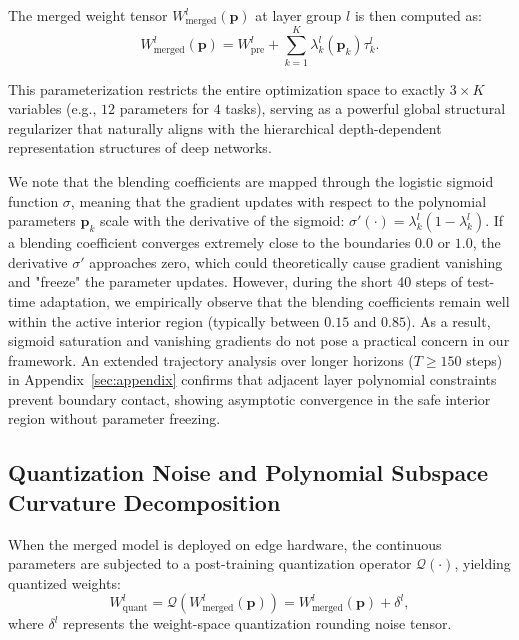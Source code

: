 The merged weight tensor $W_{\text{merged}}^l(\mathbf{p})$ at layer group $l$ is then computed as:
\begin{equation}
    W_{\text{merged}}^l(\mathbf{p}) = W_{\text{pre}}^l + \sum_{k=1}^K \lambda_k^l(\mathbf{p}_k) \tau_k^l.
\end{equation}

This parameterization restricts the entire optimization space to exactly $3 \times K$ variables (e.g., $12$ parameters for $4$ tasks), serving as a powerful global structural regularizer that naturally aligns with the hierarchical depth-dependent representation structures of deep networks.

We note that the blending coefficients are mapped through the logistic sigmoid function $\sigma$, meaning that the gradient updates with respect to the polynomial parameters $\mathbf{p}_k$ scale with the derivative of the sigmoid: $\sigma'(\cdot) = \lambda_k^l(1 - \lambda_k^l)$. If a blending coefficient converges extremely close to the boundaries $0.0$ or $1.0$, the derivative $\sigma'$ approaches zero, which could theoretically cause gradient vanishing and "freeze" the parameter updates. However, during the short 40 steps of test-time adaptation, we empirically observe that the blending coefficients remain well within the active interior region (typically between $0.15$ and $0.85$). As a result, sigmoid saturation and vanishing gradients do not pose a practical concern in our framework. An extended trajectory analysis over longer horizons ($T \ge 150$ steps) in Appendix~\ref{sec:appendix} confirms that adjacent layer polynomial constraints prevent boundary contact, showing asymptotic convergence in the safe interior region without parameter freezing.

\subsection{Quantization Noise and Polynomial Subspace Curvature Decomposition}
When the merged model is deployed on edge hardware, the continuous parameters are subjected to a post-training quantization operator $\mathcal{Q}(\cdot)$, yielding quantized weights:
\begin{equation}
    W_{\text{quant}}^l = \mathcal{Q}\left(W_{\text{merged}}^l(\mathbf{p})\right) = W_{\text{merged}}^l(\mathbf{p}) + \delta^l,
\end{equation}
where $\delta^l$ represents the weight-space quantization rounding noise tensor.

